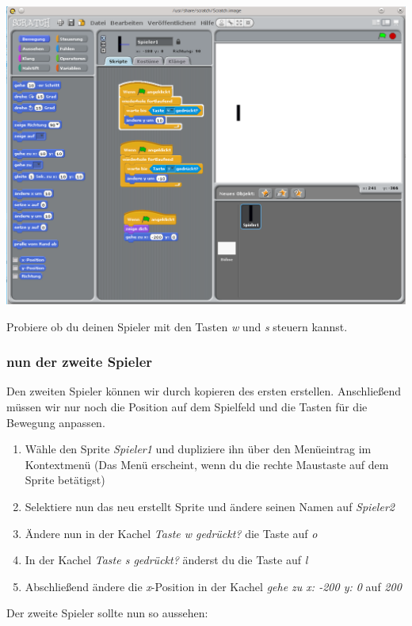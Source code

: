 \includegraphics[width=1\textwidth]{images/aufgabe5_pong_sprite_spieler1_3.png}

Probiere ob du deinen Spieler mit den Tasten \emph{w} und \emph{s} steuern kannst.

\subsubsection{nun der zweite Spieler}

Den zweiten Spieler können wir durch kopieren des ersten erstellen. Anschließend müssen wir nur noch die Position auf dem Spielfeld und die Tasten für die Bewegung anpassen.

\begin{enumerate}
\item Wähle den Sprite \emph{Spieler1} und dupliziere ihn über den Menüeintrag im Kontextmenü (Das Menü erscheint, wenn du die rechte Maustaste auf dem Sprite betätigst)
\item Selektiere nun das neu erstellt Sprite und ändere seinen Namen auf \emph{Spieler2}
\item Ändere nun in der Kachel \textit{Taste w gedrückt?} die Taste auf \emph{o}
\item In der Kachel \textit{Taste s gedrückt?} änderst du die Taste auf \emph{l}
\item Abschließend ändere die \emph{x}-Position in der Kachel \textit{gehe zu x: -200 y: 0} auf \emph{200}
\end{enumerate}

Der zweite Spieler sollte nun so aussehen:

